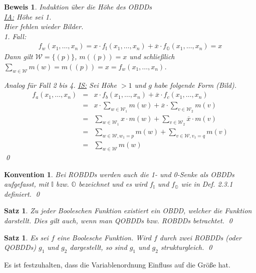 \documentclass[ngerman]{scrartcl}
\theoremstyle{custom}
\newtheorem{ms}[mdef]{Satz}
\newtheorem*{bw}{Beweis}
\newtheorem{mk}[mdef]{Konvention}
\newcommand{\0}{\mathbf{0}}
\newcommand{\1}{\mathbf{L}}
\begin{document}
\begin{bw}
Induktion \"uber die H\"ohe des OBDDs\\
\underline{IA:} H\"ohe sei 1.\\
Hier fehlen wieder Bilder.\\
1. Fall: \\
\begin{eqnarray*}
f_w(x_1,\dots,x_n)= x \cdot f_{\mathds{I}}(x_1,\dots,x_n) +
\overline{x} \cdot f_{\mathds{O}}(x_1,\dots,x_n) = x
\end{eqnarray*}
Dann gilt $\mathcal{W}=\{(p)\}$, $m((p)) = x$ und schlie\ss lich
$\sum_{w \in \mathcal{W}} m(w) = m((p))=x = f_w(x_1,\dots,x_n)$.

Analog f\"ur Fall 2 bis 4.
\underline{IS:} Sei H\"ohe $> 1$ und $g$ habe folgende Form (Bild).\\
\begin{eqnarray*}
f_a(x_1,\dots,x_n) &=& x \cdot f_b(x_1,\dots,x_n) + \overline{x} \cdot
f_c(x_1,\dots,x_n) \\
&=& x \cdot \sum_{w \in \mathcal{W}_1} m(w) + \overline{x} \cdot
\sum_{v \in \mathcal{W}_2} m(v) \\
&=& \sum_{w \in \mathcal{W}_1} x \cdot m(w) + \sum_{v \in
  \mathcal{W}_2} \overline{x} \cdot m(v) \\
&=& \sum_{w \in \mathcal{W}, w_1 = p} m(w) + \sum_{v \in
  \mathcal{W}, v_1 = q} m(v)\\
&=& \sum_{w \in \mathcal{W}} m(w)
\end{eqnarray*}
\qed
\end{bw}

\begin{mk}
Bei ROBDDs werden auch die 1- und 0-Senke als OBDDs aufgefasst, mit
$\mathds{I}$ bzw. $\mathds{O}$ bezeichnet und es wird $f_{\mathds{I}}$
und $f_{\mathds{O}}$ wie in Def. 2.3.1 definiert.
\qed
\end{mk}

\begin{ms}
Zu jeder Booleschen Funktion existiert ein OBDD, welcher die Funktion
darstellt. Dies gilt auch, wenn man QOBDDs bzw. ROBDDs betrachtet.
\qed
\end{ms}

\begin{ms}
Es sei $f$ eine Boolesche Funktion. Wird $f$ durch zwei ROBDDs (oder
QOBDDs) $g_1$ und $g_2$ dargestellt, so sind $g_1$ und $g_2$ strukturgleich.
\qed
\end{ms}

Es ist festzuhalten, dass die Variablenordnung Einfluss auf die
Gr\"o\ss e hat.
\end{document}
